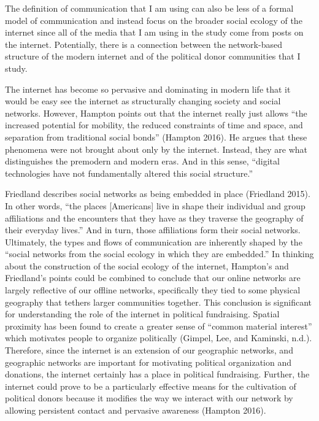 \documentclass[12pt,]{article}
\begin{document}
The definition of communication that I am using can also be less of a
formal model of communication and instead focus on the broader social
ecology of the internet since all of the media that I am using in the
study come from posts on the internet. Potentially, there is a
connection between the network-based structure of the modern internet
and of the political donor communities that I study.

The internet has become so pervasive and dominating in modern life that
it would be easy see the internet as structurally changing society and
social networks. However, Hampton points out that the internet really
just allows ``the increased potential for mobility, the reduced
constraints of time and space, and separation from traditional social
bonds'' (Hampton 2016). He argues that these phenomena were not brought
about only by the internet. Instead, they are what distinguishes the
premodern and modern eras. And in this sense, ``digital technologies
have not fundamentally altered this social structure.''

Friedland describes social networks as being embedded in place
(Friedland 2015). In other words, ``the places {[}Americans{]} live in
shape their individual and group affiliations and the encounters that
they have as they traverse the geography of their everyday lives.'' And
in turn, those affiliations form their social networks. Ultimately, the
types and flows of communication are inherently shaped by the ``social
networks from the social ecology in which they are embedded.'' In
thinking about the construction of the social ecology of the internet,
Hampton's and Friedland's points could be combined to conclude that our
online networks are largely reflective of our offline networks,
specifically they tied to some physical geography that tethers larger
communities together. This conclusion is significant for understanding
the role of the internet in political fundraising. Spatial proximity has
been found to create a greater sense of ``common material interest''
which motivates people to organize politically (Gimpel, Lee, and
Kaminski, n.d.). Therefore, since the internet is an extension of our
geographic networks, and geographic networks are important for
motivating political organization and donations, the internet certainly
has a place in political fundraising. Further, the internet could prove
to be a particularly effective means for the cultivation of political
donors because it modifies the way we interact with our network by
allowing persistent contact and pervasive awareness (Hampton 2016).
\end{document}
